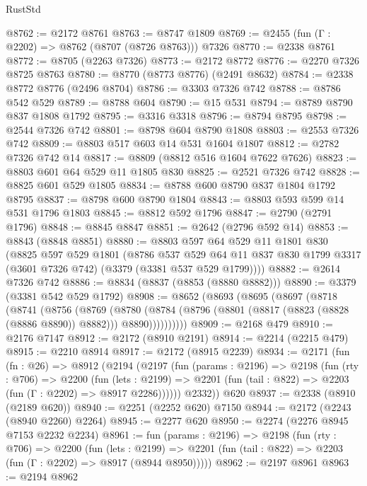 \begin{lexlean}{RustStd}
\begin{coremodule}
@8762 := @2172 @8761
@8763 := @8747 @1809
@8769 := @2455 (fun (Γ : @2202) => @8762 (@8707 (@8726 @8763))) @7326
@8770 := @2338 @8761
@8772 := @8705 (@2263 @7326)
@8773 := @2172 @8772
@8776 := @2270 @7326 @8725 @8763
@8780 := @8770 (@8773 @8776) (@2491 @8632)
@8784 := @2338 @8772 @8776 (@2496 @8704)
@8786 := @3303 @7326 @742
@8788 := @8786 @542 @529
@8789 := @8788 @604
@8790 := @15 @531
@8794 := @8789 @8790 @837 @1808 @1792
@8795 := @3316 @3318
@8796 := @8794 @8795
@8798 := @2544 @7326 @742
@8801 := @8798 @604 @8790 @1808
@8803 := @2553 @7326 @742
@8809 := @8803 @517 @603 @14 @531 @1604 @1807
@8812 := @2782 @7326 @742 @14
@8817 := @8809 (@8812 @516 @1604 @7622 @7626)
@8823 := @8803 @601 @64 @529 @11 @1805 @830
@8825 := @2521 @7326 @742
@8828 := @8825 @601 @529 @1805
@8834 := @8788 @600 @8790 @837 @1804 @1792 @8795
@8837 := @8798 @600 @8790 @1804
@8843 := @8803 @593 @599 @14 @531 @1796 @1803
@8845 := @8812 @592 @1796
@8847 := @2790 (@2791 @1796)
@8848 := @8845 @8847
@8851 := @2642 (@2796 @592 @14)
@8853 := @8843 (@8848 @8851)
@8880 := @8803
    @597
    @64
    @529
    @11
    @1801
    @830
    (@8825
      @597
      @529
      @1801
      (@8786
        @537
        @529
        @64
        @11
        @837
        @830
        @1799
        @3317
        (@3601 @7326 @742)
        (@3379 (@3381 @537 @529 @1799))))
@8882 := @2614 @7326 @742
@8886 := @8834 (@8837 (@8853 (@8880 @8882)))
@8890 := @3379 (@3381 @542 @529 @1792)
@8908 := @8652
    (@8693
      (@8695
        (@8697
          (@8718
            (@8741
              (@8756
                (@8769
                  (@8780
                    (@8784
                      (@8796 (@8801 (@8817 (@8823 (@8828 (@8886 @8890)) @8882))) @8890))))))))))
@8909 := @2168 @479
@8910 := @2176 @7147
@8912 := @2172 (@8910 @2191)
@8914 := @2214 (@2215 @479)
@8915 := @2210 @8914
@8917 := @2172 (@8915 @2239)
@8934 := @2171
    (fun (fn : @26) =>
    @8912
      (@2194
        (@2197
          (fun (params : @2196) =>
          @2198
            (fun (rty : @706) =>
            @2200
              (fun (lets : @2199) =>
              @2201 (fun (tail : @822) => @2203 (fun (Γ : @2202) => @8917 @2286))))))
        @2332))
    @620
@8937 := @2338 (@8910 (@2189 @620))
@8940 := @2251 (@2252 @620) @7150
@8944 := @2172 (@2243 (@8940 @2260) @2264)
@8945 := @2277 @620
@8950 := @2274 (@2276 @8945 @7153 @2232 @2234)
@8961 := fun (params : @2196) =>
  @2198
    (fun (rty : @706) =>
    @2200
      (fun (lets : @2199) =>
      @2201 (fun (tail : @822) => @2203 (fun (Γ : @2202) => @8917 (@8944 @8950)))))
@8962 := @2197 @8961
@8963 := @2194 @8962

\end{coremodule}
\end{lexlean}
